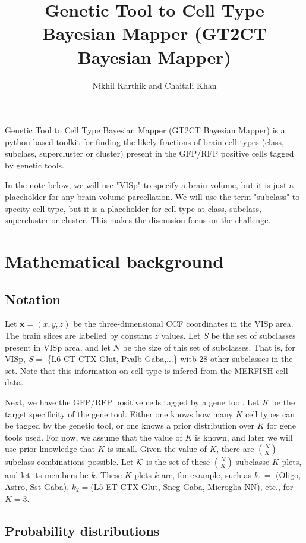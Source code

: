 \documentclass{article}
\title{Genetic Tool to Cell Type Bayesian Mapper (GT2CT Bayesian Mapper)}
\author{Nikhil Karthik and Chaitali Khan}
\begin{document}
\maketitle

Genetic Tool to Cell Type Bayesian Mapper (GT2CT Bayesian Mapper) is a python based toolkit for 
finding the likely fractions of brain cell-types (class, subclass, supercluster or cluster)
present in the GFP/RFP positive cells tagged by genetic tools.

In the note below, we will use "VISp" to specify a brain volume, but it is just a placeholder for any 
brain volume parcellation.  We will use the term "subclass" to specity cell-type, but it is a placeholder for
cell-type at class, subclass, supercluster or cluster. This makes the discussion focus on the challenge.

\section{Mathematical background}

\subsection{Notation}

Let $\mathbf{x}=(x, y, z)$ be the three-dimensional CCF coordinates in the VISp area.  The brain slices 
are labelled by constant $z$ values.  Let $S$ be the set of subclasses present in VISp area, and let 
$N$ be the size of this set of subclasses. That is, for VISp, $S =$ \{L6 CT CTX Glut, Pvalb Gaba,$\ldots$\} 
witb 28 other subclasses in the set. Note that this information on cell-type is infered from the MERFISH cell data.

Next, we have the GFP/RFP positive cells tagged by a gene tool. 
Let $K$ be the target specificity of the gene tool. Either one knows
how many $K$ cell types can be tagged by the genetic tool, or one
knows a prior distribution over $K$ for gene tools used. For now,
we assume that the value of $K$ is known, and later we will use
prior knowledge that $K$ is small. Given the value of $K$, there
are $\binom{N}{K}$ subclass combinations possible.
Let ${\cal K}$ is the set of these $\binom{N}{K}$ subclasse $K$-plets, and
let its members be $k$. These $K$-plets $k$ are, for example,
such as $k_1 =$ (Oligo, Astro, Sst Gaba), $k_2=$(L5 ET CTX Glut, Sncg Gaba, Microglia NN), etc., for 
$K=3$.

\subsection{Probability distributions}
\end{document}
